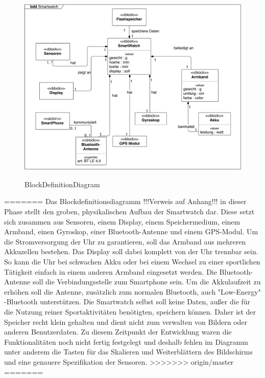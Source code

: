 \begin{figure}[htb]
\centering\
\includegraphics[width=\textwidth]{img/block1}
\caption{BlockDefinitionDiagram}\label{fig:block1}
\end{figure}
=======
Das Blockdefinitionsdiagramm !!!Verweis auf Anhang!!! in dieser Phase stellt den groben, physikalischen Aufbau der Smartwatch dar. Diese setzt sich zusammen aus Sensoren, einem Display, einem Speichermedium, einem Armband, einen Gyroskop, einer Bluetooth-Antenne und einem GPS-Modul. Um die Stromversorgung der Uhr zu garantieren, soll das Armband aus mehreren Akkuzellen bestehen. Das Display soll dabei komplett von der Uhr trennbar sein. So kann die Uhr bei schwachen Akku oder bei einem Wechsel zu einer sportlichen Tätigkeit einfach in einem anderen Armband eingesetzt werden. Die Bluetooth-Antenne soll die Verbindungsstelle zum Smartphone sein. Um die Akkulaufzeit zu erhöhen soll die Antenne, zusätzlich zum normalen Bluetooth, auch "Low-Energy" -Bluetooth unterstützen. Die Smartwatch selbst soll keine Daten, außer die für die Nutzung reiner Sportaktivitäten benötigten, speichern können. Daher ist der Speicher recht klein gehalten und dient nicht zum verwalten von Bildern oder anderen Benutzerdaten.
Zu diesem Zeitpunkt der Entwicklung waren die Funktionalitäten noch nicht fertig festgelegt und deshalb fehlen im Diagramm unter anderem die Tasten für das Skalieren und Weiterblättern des Bildschirms und eine genauere Spezifikation der Sensoren.
>>>>>>> origin/master
=======
